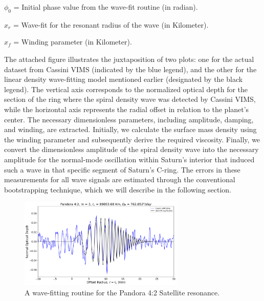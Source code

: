 \documentclass{article}
\begin{document}
\vspace{3pt}
\textbf{$\phi_{0}$} = Initial phase value from the wave-fit routine (in radian).

\vspace{3pt}
\textbf{$x_{r}$} = Wave-fit for the resonant radius of the wave (in Kilometer).

\vspace{3pt}
\textbf{$x_{f}$} = Winding parameter (in Kilometer).

\vspace{10pt}
The attached figure illustrates the juxtaposition of two plots: one for the actual dataset from Cassini VIMS (indicated by the blue legend), and the other for the linear density wave-fitting model mentioned earlier (designated by the black legend). The vertical axis corresponds to the normalized optical depth for the section of the ring where the spiral density wave was detected by Cassini VIMS, while the horizontal axis represents the radial offset in relation to the planet's center.
The necessary dimensionless parameters, including amplitude, damping, and winding, are extracted. Initially, we calculate the surface mass density using the winding parameter and subsequently derive the required viscosity. Finally, we convert the dimensionless amplitude of the spiral density wave into the necessary amplitude for the normal-mode oscillation within Saturn's interior that induced such a wave in that specific segment of Saturn's C-ring.
The errors in these measurements for all wave signals are estimated through the conventional bootstrapping technique, which we will describe in the following section.


\begin{figure}[h]
\centering 
\includegraphics[width=0.7\textwidth]{pandora42.png} 
\caption{A wave-fitting routine for the Pandora 4:2 Satellite resonance.} \label{fig:my_label}
\end{figure}
\end{document}
